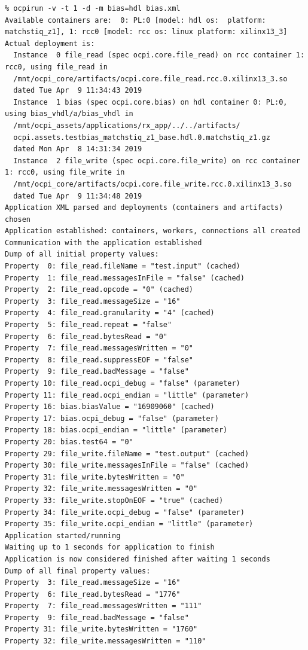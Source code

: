 \begin{verbatim}
% ocpirun -v -t 1 -d -m bias=hdl bias.xml
Available containers are:  0: PL:0 [model: hdl os:  platform:
matchstiq_z1], 1: rcc0 [model: rcc os: linux platform: xilinx13_3]
Actual deployment is:
  Instance  0 file_read (spec ocpi.core.file_read) on rcc container 1: rcc0, using file_read in
  /mnt/ocpi_core/artifacts/ocpi.core.file_read.rcc.0.xilinx13_3.so
  dated Tue Apr  9 11:34:43 2019
  Instance  1 bias (spec ocpi.core.bias) on hdl container 0: PL:0, using bias_vhdl/a/bias_vhdl in
  /mnt/ocpi_assets/applications/rx_app/../../artifacts/
  ocpi.assets.testbias_matchstiq_z1_base.hdl.0.matchstiq_z1.gz
  dated Mon Apr  8 14:31:34 2019
  Instance  2 file_write (spec ocpi.core.file_write) on rcc container 1: rcc0, using file_write in
  /mnt/ocpi_core/artifacts/ocpi.core.file_write.rcc.0.xilinx13_3.so
  dated Tue Apr  9 11:34:48 2019
Application XML parsed and deployments (containers and artifacts) chosen
Application established: containers, workers, connections all created
Communication with the application established
Dump of all initial property values:
Property  0: file_read.fileName = "test.input" (cached)
Property  1: file_read.messagesInFile = "false" (cached)
Property  2: file_read.opcode = "0" (cached)
Property  3: file_read.messageSize = "16"
Property  4: file_read.granularity = "4" (cached)
Property  5: file_read.repeat = "false"
Property  6: file_read.bytesRead = "0"
Property  7: file_read.messagesWritten = "0"
Property  8: file_read.suppressEOF = "false"
Property  9: file_read.badMessage = "false"
Property 10: file_read.ocpi_debug = "false" (parameter)
Property 11: file_read.ocpi_endian = "little" (parameter)
Property 16: bias.biasValue = "16909060" (cached)
Property 17: bias.ocpi_debug = "false" (parameter)
Property 18: bias.ocpi_endian = "little" (parameter)
Property 20: bias.test64 = "0"
Property 29: file_write.fileName = "test.output" (cached)
Property 30: file_write.messagesInFile = "false" (cached)
Property 31: file_write.bytesWritten = "0"
Property 32: file_write.messagesWritten = "0"
Property 33: file_write.stopOnEOF = "true" (cached)
Property 34: file_write.ocpi_debug = "false" (parameter)
Property 35: file_write.ocpi_endian = "little" (parameter)
Application started/running
Waiting up to 1 seconds for application to finish
Application is now considered finished after waiting 1 seconds
Dump of all final property values:
Property  3: file_read.messageSize = "16"
Property  6: file_read.bytesRead = "1776"
Property  7: file_read.messagesWritten = "111"
Property  9: file_read.badMessage = "false"
Property 31: file_write.bytesWritten = "1760"
Property 32: file_write.messagesWritten = "110"
\end{verbatim}

